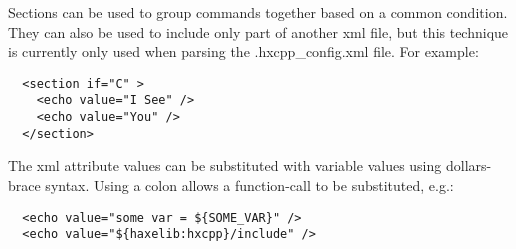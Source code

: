 Sections can be used to group commands together based on a common condition.  They can also be used to include only part of another xml file, but this technique is currently only used when parsing the .hxcpp_config.xml file.  For example:

\begin{lstlisting}
  <section if="C" >
    <echo value="I See" />
    <echo value="You" />
  </section>
\end{lstlisting}

The xml attribute values can be substituted with variable values using dollars-brace syntax.  Using a colon allows a function-call to be substituted, e.g.:

\begin{lstlisting}
  <echo value="some var = ${SOME_VAR}" />
  <echo value="${haxelib:hxcpp}/include" />
\end{lstlisting}

